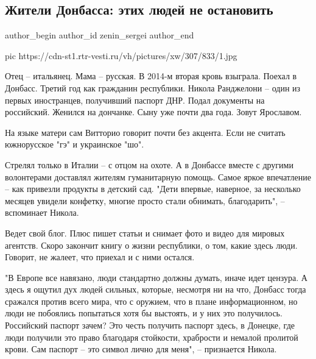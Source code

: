  
 
 
 
 
 
\subsection{Жители Донбасса: этих людей не остановить}
\label{sec:13_12_2020.news.ru.vesti.zenin_sergei.1.zhiteli_donbassa_etih_ljudei_ne_ostanovit}
\ifcmt
	author_begin
   author_id zenin_sergei
	author_end
\fi

\ifcmt
pic https://cdn-st1.rtr-vesti.ru/vh/pictures/xw/307/833/1.jpg
\fi

Отец – итальянец. Мама – русская. В 2014-м вторая кровь взыграла. Поехал в
Донбасс. Третий год как гражданин республики. Никола Ранджелони – один из
первых иностранцев, получивший паспорт ДНР. Подал документы на российский.
Женился на дончанке. Сыну уже почти два года. Зовут Ярославом.

На языке матери сам Витторио говорит почти без акцента. Если не считать
южнорусское "гэ" и украинское "шо".

Стрелял только в Италии – с отцом на охоте. А в Донбассе вместе с другими
волонтерами доставлял жителям гуманитарную помощь. Самое яркое впечатление –
как привезли продукты в детский сад. "Дети впервые, наверное, за несколько
месяцев увидели конфетку, многие просто стали обнимать, благодарить", –
вспоминает Никола.

Ведет свой блог. Плюс пишет статьи и снимает фото и видео для мировых агентств.
Скоро закончит книгу о жизни республики, о том, какие здесь люди. Говорит, не
жалеет, что приехал и с ними остался.

"В Европе все навязано, люди стандартно должны думать, иначе идет цензура. А
здесь я ощутил дух людей сильных, которые, несмотря ни на что, Донбасс тогда
сражался против всего мира, что с оружием, что в плане информационном, но люди
не побоялись попытаться хотя бы выстоять, и у них это получилось. Российский
паспорт зачем? Это честь получить паспорт здесь, в Донецке, где люди получили
это право благодаря стойкости, храбрости и немалой пролитой крови. Сам паспорт
– это символ лично для меня", – признается Никола.

